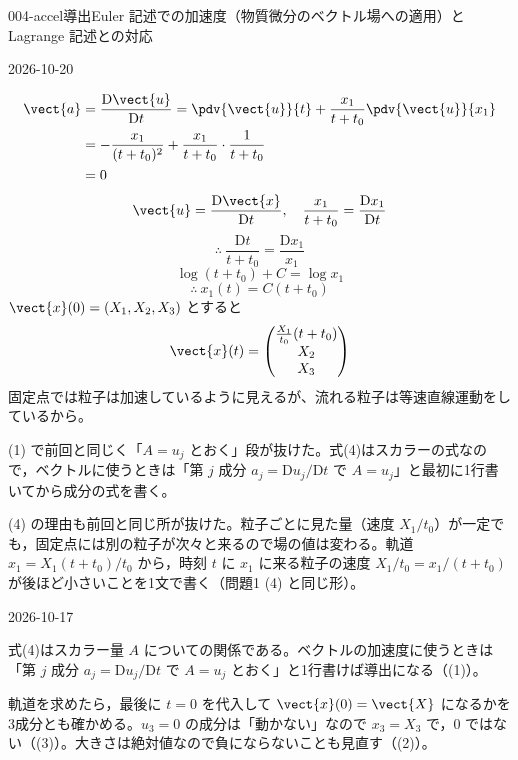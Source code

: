 \documentclass[uplatex,dvipdfmx,a4paper,11pt]{jsarticle}
\begin{document}
\begin{mondai}{004-accel}{導出}{Euler 記述での加速度（物質微分のベクトル場への適用）と Lagrange 記述との対応}
\begin{kotaeutsushi}{2026-10-20}
\begin{align*}
\end{align*}
\begin{align*}
\vect{a}&=\frac{\mathrm{D}\vect{u}}{\mathrm{D}t}=\pdv{\vect{u}}{t}+\frac{x_{1}}{t+t_{0}}\pdv{\vect{u}}{x_{1}}\\
&=-\frac{x_{1}}{(t+t_{0})^{2}}+\frac{x_{1}}{t+t_{0}}\cdot\frac{1}{t+t_{0}}\\
&=0
\end{align*}
\[ \vect{u}=\frac{\mathrm{D}\vect{x}}{\mathrm{D}t},\quad \frac{x_{1}}{t+t_{0}}=\frac{\mathrm{D}x_{1}}{\mathrm{D}t} \]
\[ \therefore\ \frac{\mathrm{D}t}{t+t_{0}}=\frac{\mathrm{D}x_{1}}{x_{1}} \]
\[ \log(t+t_{0})+C=\log x_{1} \]
\[ \therefore\ x_{1}(t)=C(t+t_{0}) \]
$\vect{x}(0)=(X_{1},X_{2},X_{3})$ とすると
\[ \vect{x}(t)=\begin{pmatrix}\frac{X_{1}}{t_{0}}(t+t_{0})\\X_{2}\\X_{3}\end{pmatrix} \]
固定点では粒子は加速しているように見えるが、流れる粒子は等速直線運動をしているから。
\end{kotaeutsushi}
\begin{kizuki}
\item {}(1) で前回と同じく「$A=u_{j}$ とおく」段が抜けた。式(4)はスカラーの式なので，ベクトルに使うときは「第 $j$ 成分 $a_{j}=\mathrm{D}u_{j}/\mathrm{D}t$ で $A=u_{j}$」と最初に1行書いてから成分の式を書く。
\item {}(4) の理由も前回と同じ所が抜けた。粒子ごとに見た量（速度 $X_{1}/t_{0}$）が一定でも，固定点には別の粒子が次々と来るので場の値は変わる。軌道 $x_{1}=X_{1}(t+t_{0})/t_{0}$ から，時刻 $t$ に $x_{1}$ に来る粒子の速度 $X_{1}/t_{0}=x_{1}/(t+t_{0})$ が後ほど小さいことを1文で書く（問題1 (4) と同じ形）。
\end{kizuki}
\begin{maekizuki}{2026-10-17}
\item 式(4)はスカラー量 $A$ についての関係である。ベクトルの加速度に使うときは「第 $j$ 成分 $a_{j}=\mathrm{D}u_{j}/\mathrm{D}t$ で $A=u_{j}$ とおく」と1行書けば導出になる（(1)）。
\item 軌道を求めたら，最後に $t=0$ を代入して $\vect{x}(0)=\vect{X}$ になるかを3成分とも確かめる。$u_{3}=0$ の成分は「動かない」なので $x_{3}=X_{3}$ で，0 ではない（(3)）。大きさは絶対値なので負にならないことも見直す（(2)）。

\end{maekizuki}
\end{mondai}
\end{document}
